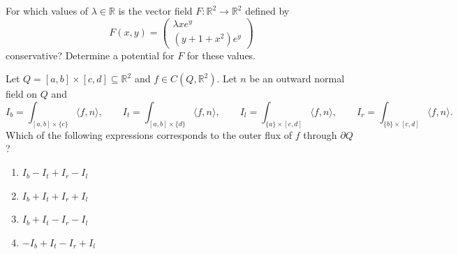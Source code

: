

\begin{exercise}
\label{ex:conservative_vector_field_potential}
For which values of $\lambda \in \mathbb{R}$ is the vector field $F : \mathbb{R}^2 \to
\mathbb{R}^2$ defined by
\[F(x,y) = \begin{pmatrix} \lambda x e^y \\ (y+1+x^2)e^y \end{pmatrix}\]
conservative? Determine a potential for $F$ for these values.
\end{exercise}



\begin{exercise}
\label{ex:outward_flux_sign_convention}
Let $Q = [a,b]\times[c,d] \subseteq \mathbb{R}^2$ and $f \in C(Q,\mathbb{R}^2)$. Let $n$ be an
outward normal field on $Q$ and
\[I_b = \int_{[a,b]\times\{c\}} \langle f,n\rangle, \qquad I_t = \int_{[a,b]\times\{d\}}
  \langle f,n\rangle, \qquad I_l = \int_{\{a\}\times[c,d]} \langle f,n\rangle, \qquad
  I_r = \int_{\{b\}\times[c,d]} \langle f,n\rangle.\]
Which of the following expressions corresponds to the outer flux of $f$ through $\partial Q$?
\begin{enumerate}[label=\textbf{(\alph*)}]
  \item $I_b - I_t + I_r - I_l$
  \item $I_b + I_t + I_r + I_l$
  \item $I_b + I_t - I_r - I_l$
  \item $-I_b + I_t - I_r + I_l$
\end{enumerate}
\end{exercise}

